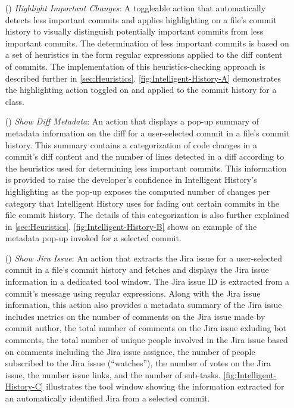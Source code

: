 \begin{itemize}
    \item[(\feature{1})] \textit{Highlight Important Changes}: 
        A toggleable action that automatically detects less important commits and applies highlighting on a file's commit history to visually distinguish potentially important commits from less important commits. 
        The determination of less important commits is based on a set of heuristics in the form regular expressions applied to the diff content of commits. 
        The implementation of this heuristics-checking approach is described further in \autoref{sec:Heuristics}. 
        \autoref{fig:Intelligent-History-A} demonstrates the highlighting action toggled on and applied to the commit history for a class.
    \item[(\feature{2})] \textit{Show Diff Metadata}: 
        An action that displays a pop-up summary of metadata information on the diff for a user-selected commit in a file's commit history. 
        This summary contains a categorization of code changes in a commit's diff content and the number of lines detected in a diff according to the heuristics used for determining less important commits. 
        This information is provided to raise the developer's confidence in Intelligent History's highlighting as the pop-up exposes the computed number of changes per category that Intelligent History uses for fading out certain commits in the file commit history. 
        The details of this categorization is also further explained in \autoref{sec:Heuristics}. \autoref{fig:Intelligent-History-B} shows an example of the metadata pop-up invoked for a selected commit.
    \item[(\feature{3})] \textit{Show Jira Issue}: 
        An action that extracts the Jira issue  for a user-selected commit in a file's commit history and fetches and displays the Jira issue information in a dedicated tool window. 
        The Jira issue ID is extracted from a commit's message using regular expressions. Along with the Jira issue information, 
        this action also provides a metadata summary of the Jira issue  includes metrics on the number of comments on the Jira issue made by commit author, 
        the total number of comments on the Jira issue exluding bot comments, the total number of unique people involved in the Jira issue based on comments including the Jira issue assignee, 
        the number of people subscribed to the Jira issue (``watches''), the number of votes on the Jira issue, the number issue links, 
        and the number of sub-tasks. \autoref{fig:Intelligent-History-C} illustrates the tool window showing the information extracted for an automatically identified Jira  from a selected commit.
\end{itemize}

